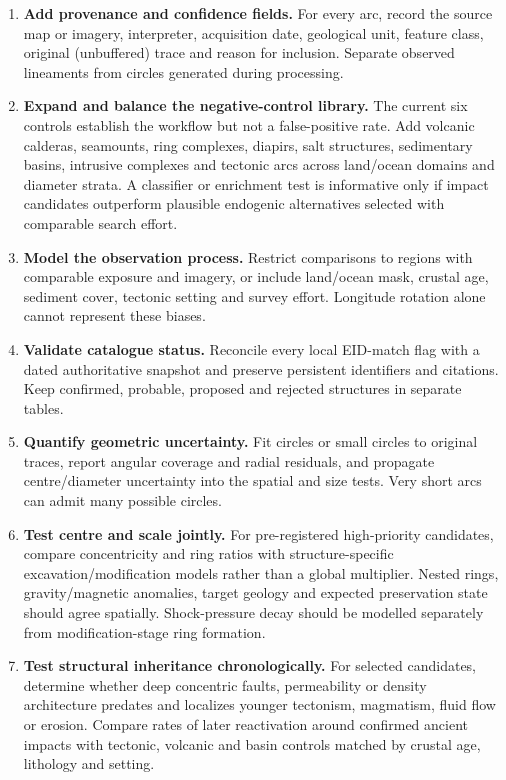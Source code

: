 \documentclass[11pt]{article}
\begin{document}
\begin{enumerate}
  \item \textbf{Add provenance and confidence fields.} For every arc, record the source map or imagery, interpreter, acquisition date, geological unit, feature class, original (unbuffered) trace and reason for inclusion. Separate observed lineaments from circles generated during processing.
  \item \textbf{Expand and balance the negative-control library.} The current six controls establish the workflow but not a false-positive rate. Add volcanic calderas, seamounts, ring complexes, diapirs, salt structures, sedimentary basins, intrusive complexes and tectonic arcs across land/ocean domains and diameter strata. A classifier or enrichment test is informative only if impact candidates outperform plausible endogenic alternatives selected with comparable search effort.
  \item \textbf{Model the observation process.} Restrict comparisons to regions with comparable exposure and imagery, or include land/ocean mask, crustal age, sediment cover, tectonic setting and survey effort. Longitude rotation alone cannot represent these biases.
  \item \textbf{Validate catalogue status.} Reconcile every local EID-match flag with a dated authoritative snapshot and preserve persistent identifiers and citations. Keep confirmed, probable, proposed and rejected structures in separate tables.
  \item \textbf{Quantify geometric uncertainty.} Fit circles or small circles to original traces, report angular coverage and radial residuals, and propagate centre/diameter uncertainty into the spatial and size tests. Very short arcs can admit many possible circles.
  \item \textbf{Test centre and scale jointly.} For pre-registered high-priority candidates, compare concentricity and ring ratios with structure-specific excavation/modification models rather than a global multiplier. Nested rings, gravity/magnetic anomalies, target geology and expected preservation state should agree spatially. Shock-pressure decay should be modelled separately from modification-stage ring formation.
  \item \textbf{Test structural inheritance chronologically.} For selected candidates, determine whether deep concentric faults, permeability or density architecture predates and localizes younger tectonism, magmatism, fluid flow or erosion. Compare rates of later reactivation around confirmed ancient impacts with tectonic, volcanic and basin controls matched by crustal age, lithology and setting.

\end{enumerate}
\end{document}
